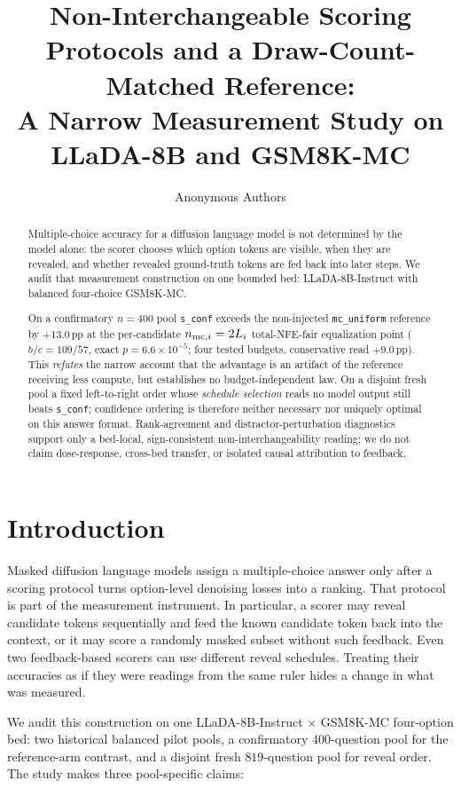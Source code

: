 \documentclass{article}
\title{Non-Interchangeable Scoring Protocols and a Draw-Count-Matched Reference:\\
A Narrow Measurement Study on LLaDA-8B and GSM8K-MC}
\author{Anonymous Authors}
\newcommand{\sconf}{\texttt{s\_conf}}
\newcommand{\mcu}{\texttt{mc\_uniform}}
\newcommand{\pp}{\,\mathrm{pp}}
\begin{document}
\maketitle
\thispagestyle{fancy}

\begin{abstract}
Multiple-choice accuracy for a diffusion language model is not determined by
the model alone: the scorer chooses which option tokens are visible, when they
are revealed, and whether revealed ground-truth tokens are fed back into later
steps.  We audit that measurement construction on one bounded bed:
LLaDA-8B-Instruct with balanced four-choice GSM8K-MC.

On a confirmatory $n{=}400$ pool \sconf{} exceeds the non-injected
\mcu{} reference by $+13.0\pp$ at the per-candidate
$n_{{\rm mc},i}=2L_i$ total-NFE-fair equalization point ($b/c=109/57$,
exact $p=6.6\!\times\!10^{-5}$; four tested budgets, conservative read
$+9.0\pp$).  This \emph{refutes} the narrow account that the advantage is
an artifact of the reference receiving less compute, but establishes no
budget-independent law.  On a disjoint fresh pool a fixed left-to-right
order whose \emph{schedule selection} reads no model output still beats
\sconf{}; confidence ordering is therefore neither necessary nor uniquely
optimal on this answer format.  Rank-agreement and distractor-perturbation
diagnostics support only a bed-local, sign-consistent non-interchangeability
reading; we do not claim dose-response, cross-bed transfer, or isolated
causal attribution to feedback.
\end{abstract}

\section{Introduction}
\label{sec:intro}

Masked diffusion language models assign a multiple-choice answer only after a
scoring protocol turns option-level denoising losses into a ranking.  That
protocol is part of the measurement instrument.  In particular, a scorer may
reveal candidate tokens sequentially and feed the known candidate token back
into the context, or it may score a randomly masked subset without such
feedback.  Even two feedback-based scorers can use different reveal schedules.
Treating their accuracies as if they were readings from the same ruler hides a
change in what was measured.

We audit this construction on one LLaDA-8B-Instruct $\times$ GSM8K-MC
four-option bed: two historical balanced pilot pools, a confirmatory
$400$-question pool for the reference-arm contrast, and a disjoint fresh
$819$-question pool for reveal order.  The study makes three pool-specific
claims:
\end{document}
